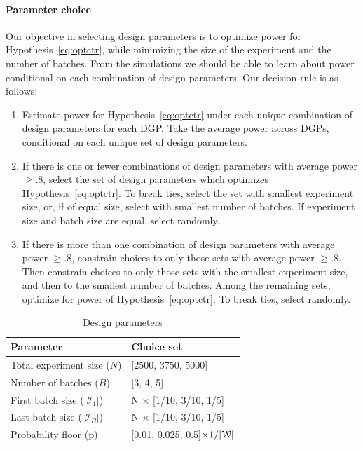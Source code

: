 \documentclass[letterpaper, 12pt, parskip=full,]{scrartcl}
\begin{document}
\paragraph{Parameter choice}
Our objective in selecting design parameters is to optimize power for Hypothesis~\ref{eq:optctr}, while minimizing the size of the experiment and the number of batches. From the simulations we should be able to learn about power conditional on each combination of design parameters. Our decision rule is as follows:
\begin{enumerate}
\item Estimate power for Hypothesis~\ref{eq:optctr} under each unique combination of design parameters for each DGP. Take the average power across DGPs, conditional on each unique set of design parameters. 
\item If there is one or fewer combinations of design parameters with average power $\ge.8$, select the set of design parameters which optimizes Hypothesis~\ref{eq:optctr}. To break ties, select the set with smallest experiment size, or, if of equal size, select with smallest number of batches. If experiment size and batch size are equal, select randomly. 
\item If there is more than one combination of design parameters with average power $\ge.8$, constrain choices to only those sets with average power $\ge.8$. Then constrain choices to only those sets with the smallest experiment size, and then to the smallest number of batches. Among the remaining sets, optimize for power of Hypothesis~\ref{eq:optctr}. To break ties, select randomly. 
\end{enumerate}

\begin{table}[H]
\centering
\caption{Design parameters} 
\label{tab:design}
\begin{tabular}{l | l}
\textbf{Parameter} & \textbf{Choice set} \\ \hline
Total experiment size ($N$)& [2500, 3750, 5000] \\
Number of batches ($B$)& [3, 4, 5] \\
First batch size ($|\mathcal{I}_1|$) & N $\times$ [1/10, 3/10, 1/5] \\
Last batch size ($|\mathcal{I}_B|$) & N $\times$ [1/10, 3/10, 1/5] \\
Probability floor (p)& [0.01, 0.025, 0.5]$\times 1/ |{\EuScript W}|$ \\
\hline
\end{tabular}
\end{table}
\end{document}
